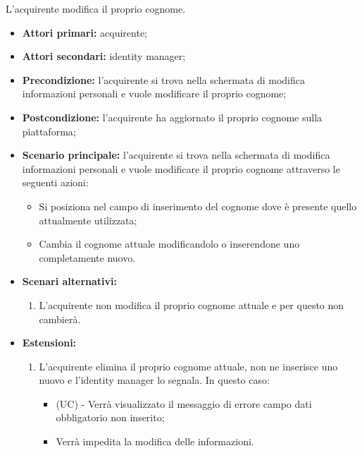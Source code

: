L'acquirente modifica il proprio cognome.
\begin{itemize}
    \item \textbf{Attori primari:} acquirente;
    \item \textbf{Attori secondari:} identity manager;
    \item \textbf{Precondizione:} l'acquirente si trova nella schermata di modifica informazioni personali e vuole modificare il proprio cognome;
    \item \textbf{Postcondizione:} l'acquirente ha aggiornato il proprio cognome sulla piattaforma;
    \item \textbf{Scenario principale:} l'acquirente si trova nella schermata di modifica informazioni personali e vuole modificare il proprio cognome attraverso le seguenti azioni:
        \begin{itemize}
            \item Si posiziona nel campo di inserimento del cognome dove è presente quello attualmente utilizzata;
            \item Cambia il cognome attuale modificandolo o inserendone uno completamente nuovo.
        \end{itemize}
    \item \textbf{Scenari alternativi:} 
    \begin{enumerate}[label=\lett]
        \item L'acquirente non modifica il proprio cognome attuale e per questo non cambierà.
    \end{enumerate}
    \item \textbf{Estensioni:} 
    \begin{enumerate}[label=\lett]
        \item L'acquirente elimina il proprio cognome attuale, non ne inserisce uno nuovo e l'identity manager lo segnala. In questo caso:
        \begin{itemize}
            \item (UC) - Verrà visualizzato il messaggio di errore campo dati obbligatorio non inserito;
            \item Verrà impedita la modifica delle informazioni.
        \end{itemize}
    \end{enumerate}
\end{itemize}

